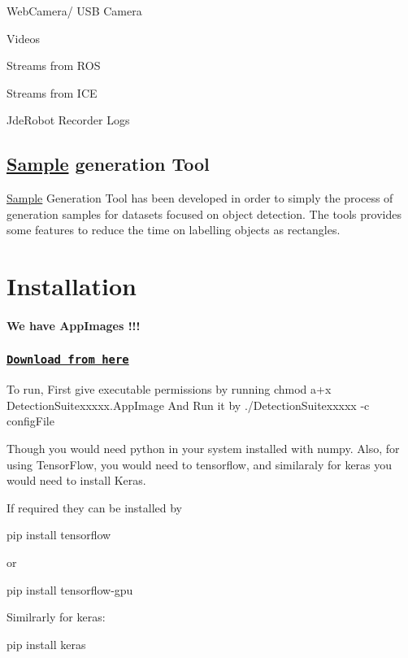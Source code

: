 \begin{DoxyItemize}
\item Web\+Camera/ U\+SB Camera
\item Videos
\item Streams from R\+OS
\item Streams from I\+CE
\item Jde\+Robot Recorder Logs
\end{DoxyItemize}

\subsection*{\hyperlink{struct_sample}{Sample} generation Tool}

\hyperlink{struct_sample}{Sample} Generation Tool has been developed in order to simply the process of generation samples for datasets focused on object detection. The tools provides some features to reduce the time on labelling objects as rectangles.

\section*{Installation}

\paragraph*{We have App\+Images !!!}

\subsubsection*{\href{https://github.com/vinay0410/dl-DetectionSuite/releases/tag/continuous}{\tt Download from here}}

To run, First give executable permissions by running {\ttfamily chmod a+x Detection\+Suitexxxxx.\+App\+Image} And Run it by {\ttfamily ./\+Detection\+Suitexxxxx -\/c config\+File}

Though you would need {\ttfamily python} in your system installed with {\ttfamily numpy}. Also, for using Tensor\+Flow, you would need to tensorflow, and similaraly for keras you would need to install Keras.

If required they can be installed by 
\begin{DoxyCode}
pip install tensorflow
\end{DoxyCode}
 or


\begin{DoxyCode}
pip install tensorflow-gpu
\end{DoxyCode}
 Similrarly for keras\+: 
\begin{DoxyCode}
pip install keras
\end{DoxyCode}


